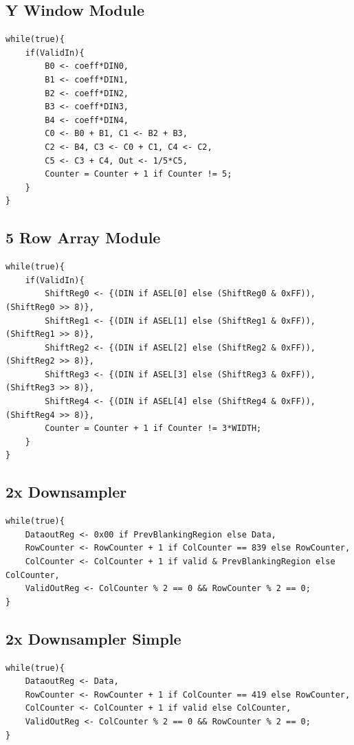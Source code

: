 \documentclass[11pt]{article}
\begin{document}
\subsection*{Y Window Module}
\begin{lstlisting}
while(true){
    if(ValidIn){
        B0 <- coeff*DIN0, 
        B1 <- coeff*DIN1, 
        B2 <- coeff*DIN2, 
        B3 <- coeff*DIN3, 
        B4 <- coeff*DIN4, 
        C0 <- B0 + B1, C1 <- B2 + B3, 
        C2 <- B4, C3 <- C0 + C1, C4 <- C2, 
        C5 <- C3 + C4, Out <- 1/5*C5, 
        Counter = Counter + 1 if Counter != 5;
    }
}
\end{lstlisting}

\subsection*{5 Row Array Module}

\begin{lstlisting}
while(true){
    if(ValidIn){
        ShiftReg0 <- {(DIN if ASEL[0] else (ShiftReg0 & 0xFF)),  (ShiftReg0 >> 8)},
        ShiftReg1 <- {(DIN if ASEL[1] else (ShiftReg1 & 0xFF)),  (ShiftReg1 >> 8)},
        ShiftReg2 <- {(DIN if ASEL[2] else (ShiftReg2 & 0xFF)),  (ShiftReg2 >> 8)},
        ShiftReg3 <- {(DIN if ASEL[3] else (ShiftReg3 & 0xFF)),  (ShiftReg3 >> 8)},
        ShiftReg4 <- {(DIN if ASEL[4] else (ShiftReg4 & 0xFF)),  (ShiftReg4 >> 8)},
        Counter = Counter + 1 if Counter != 3*WIDTH;
    }
}
\end{lstlisting}

\subsection*{2x Downsampler}
\begin{lstlisting}
while(true){
    DataoutReg <- 0x00 if PrevBlankingRegion else Data,
    RowCounter <- RowCounter + 1 if ColCounter == 839 else RowCounter,
    ColCounter <- ColCounter + 1 if valid & PrevBlankingRegion else ColCounter,
    ValidOutReg <- ColCounter % 2 == 0 && RowCounter % 2 == 0;
}
\end{lstlisting}

\subsection*{2x Downsampler Simple}
\begin{lstlisting}
while(true){
    DataoutReg <- Data,
    RowCounter <- RowCounter + 1 if ColCounter == 419 else RowCounter,
    ColCounter <- ColCounter + 1 if valid else ColCounter,
    ValidOutReg <- ColCounter % 2 == 0 && RowCounter % 2 == 0;
}
\end{lstlisting}
\end{document}
